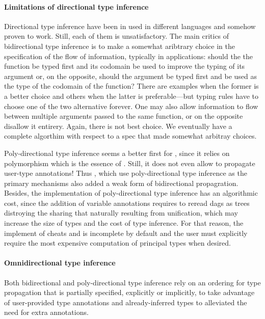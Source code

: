 \documentclass[acmsmall,screen,nonacm]{acmart}
\begin{document}
\paragraph{Limitations of directional type inference}

Directional type inference have been in used in different languages and
somehow proven to work. Still, each of them is unsatisfactory.  The main
critics of bidirectional type inference is to make a somewhat aribtrary
choice in the specification of the flow of information, typically in
applications: should the the function be typed first and its codomain be
used to improve the typing of its argument or, on the opposite, should the
argument be typed first and be used as the type of the codomain of the
function?  There are examples when the former is a better choice and others
when the latter is preferable---but typing rules have to choose one of the
two alternative forever.  One may also allow information to flow between
multiple arguments passed to the same function, or on the opposite disallow
it entirery. Again, there is not best choice. We eventually have a complete
algorthim with respect to a spec that made somewhat arbitray choices.

Poly-directional type inference seems a better first for \ML, since it
relies on polymorphism which is the essence of \ML. Still, it does not even
allow to propagate user-type annotations! Thus \OCaml, which use
poly-directional type inference as the primary mechanisms also added a weak
form of bidirectional propagration. Besides, the implementation of
poly-directional type inference has an algorithmic cost, since the addition
of variable annotations requires to reread dags as trees distroying the
sharing that naturally resulting from unification, which may increase the
size of types and the cost of type inference. For that reason, the implement
of \OCaml cheats and is incomplete by default and the user must explicitly
require the most expensive computation of principal types when desired.

\paragraph{Omnidirectional type inference}

Both bidirectional and poly-directional type inference rely on an ordering
for type propagation that is partially specified, explicitly or implicitly,
to take advantage of user-provided type annotations and already-inferred types
to alleviated the need for extra annotations.
\end{document}
